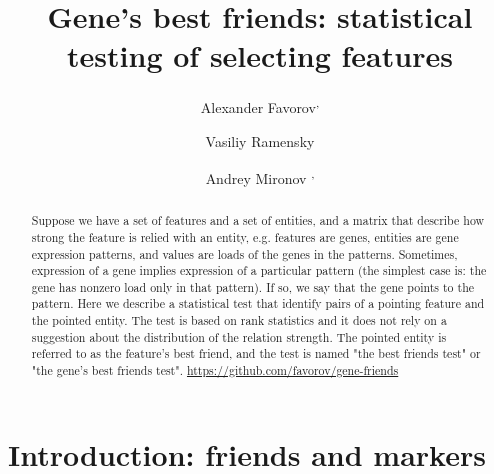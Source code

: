 \documentclass{llncs}
\begin{document}
%
\title{Gene's best friends: statistical testing of selecting features}
%
%
\author{Alexander Favorov\textsuperscript, \and Vasiliy Ramensky 
\and Andrey Mironov \textsuperscript,}
%
%
%

\maketitle              %

\begin{abstract}
Suppose we have a set of features and a set of entities, and a matrix that describe how strong the feature is relied with an entity, e.g. features are genes, entities are gene expression patterns, and values are loads of the genes in the patterns. Sometimes, expression of a gene implies expression of a particular pattern (the simplest case is: the gene has nonzero load only in that pattern). If so, we say that the gene points to the pattern. Here we describe a statistical test that identify pairs of a pointing feature and the pointed entity. The test is based on rank statistics and it does not rely on a suggestion about the distribution of the relation strength. The pointed entity is referred to as the feature's best friend, and the test is named "the best friends test" or "the gene's best friends test". \url{https://github.com/favorov/gene-friends}
\end{abstract}
%
\section{Introduction: friends and markers}
\end{document}
